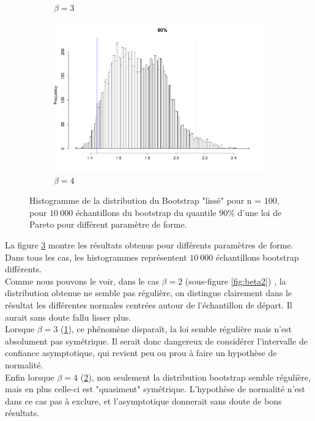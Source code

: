 \documentclass{article}
\renewcommand*{\(}{ \left( }
\renewcommand*{\)}{ \right) }
\begin{document}
\begin{figure}[H]
\begin{subfigure}[t]{0.3\textwidth}
        \caption{$\beta = 3$}
        \label{fig:beta3}
    \end{subfigure}%
    \begin{subfigure}[t]{0.3\textwidth}
        \includegraphics[width = \linewidth]{img/Smooth-90-4.pdf}
        \caption{$\beta = 4$}
        \label{fig:beta4}
    \end{subfigure}%
    \caption{Histogramme de la distribution du Bootstrap "lissé" pour n = 100, pour $10~000$ échantillons du bootstrap du quantile $90\%$ d'une loi de Pareto pour différent paramètre de forme.}
    \label{fig:beta}
\end{figure}

La figure \ref{fig:beta} montre les résultats obtenus pour différents paramètres de forme. Dans tous les cas, les histogrammes représentent $10~000$ échantillons bootstrap différents.\\
Comme nous pouvons le voir, dans le cas $\beta = 2$ (sous-figure \ref{fig:beta2}) , la distribution obtenue ne semble pas régulière, on distingue clairement dans le résultat les différentes normales centrées autour de l'échantillon de départ. Il aurait sans doute fallu lisser plus.\\
Lorsque $\beta = 3$ (\ref{fig:beta3}), ce phénomène disparaît, la loi semble régulière mais n'est absolument pas symétrique. Il serait donc dangereux de considérer l'intervalle de confiance asymptotique, qui revient peu ou prou à faire un hypothèse de normalité.\\
Enfin lorsque $\beta = 4$ (\ref{fig:beta4}), non seulement la distribution bootstrap semble régulière, mais en plus celle-ci est "quasiment" symétrique. L'hypothèse de normalité n'est dans ce cas pas à exclure, et l'asymptotique donnerait sans doute de bons résultats. \\
\end{document}
